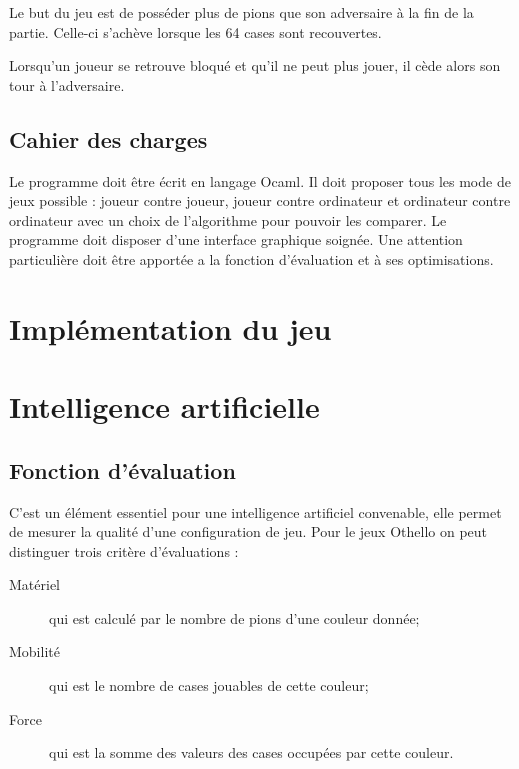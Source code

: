 \documentclass[10pt,a4paper]{report}
\begin{document}
Le but du jeu est de posséder plus de pions que son adversaire à la fin de la partie. Celle-ci s'achève lorsque les 64 cases sont recouvertes.

Lorsqu'un joueur se retrouve bloqué et qu'il ne peut plus jouer, il cède alors son tour à l'adversaire.

\section{Cahier des charges}
Le programme doit être écrit en langage Ocaml.
Il doit proposer tous les mode de jeux possible : joueur contre joueur, joueur contre ordinateur et ordinateur contre ordinateur avec un choix de l'algorithme pour pouvoir les comparer.
Le programme doit disposer d'une interface graphique soignée.
Une attention particulière doit être apportée a la fonction d'évaluation et à ses optimisations.

\chapter{Implémentation du jeu}

\chapter{Intelligence artificielle}

\section{Fonction d'évaluation}
C'est un élément essentiel pour une intelligence artificiel convenable, elle permet de mesurer la qualité d'une configuration de jeu. Pour le jeux Othello on peut distinguer trois critère d'évaluations :
\begin{description}
\item[Matériel] qui est calculé par le nombre de pions d'une couleur donnée;
\item[Mobilité] qui est le nombre de cases jouables de cette couleur;
\item[Force] qui est la somme des valeurs des cases occupées par cette couleur.
\end{description}
\end{document}
